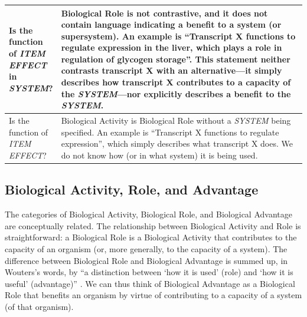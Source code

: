 \documentclass{article}
\begin{document}
\begin{landscape}
\begin{table}
\begin{tabular}{|p{0.17\linewidth}|p{0.97\linewidth}|}
    \hline
    Is the function of \emph{ITEM} \emph{EFFECT} in \emph{SYSTEM}? &  Biological Role is not contrastive, and it does not contain language indicating a benefit to a system (or supersystem). An example is ``Transcript X functions to regulate expression in the liver, which plays a role in regulation of glycogen storage''. This statement neither contrasts transcript X with an alternative---it simply describes how transcript X contributes to a capacity of the \emph{SYSTEM}---nor explicitly describes a benefit to the \emph{SYSTEM}.  \\
    \hline
    Is the function of \emph{ITEM} \emph{EFFECT}? &  Biological Activity is Biological Role without a \emph{SYSTEM} being specified. An example is ``Transcript X functions to regulate expression'', which simply describes what transcript X does. We do not know how (or in what system) it is being used. \\
    \hline
  \end{tabular}
  \label{tab:flowchart}
\end{table}
\end{landscape}

\subsection{Biological Activity, Role, and Advantage}
\label{sec:relat-betw-funct}

The categories of Biological Activity, Biological Role, and Biological Advantage are conceptually related.
The relationship between Biological Activity and Role is straightforward: a Biological Role is a Biological Activity that contributes to the capacity of an organism (or, more generally, to the capacity of a system). 
The difference between Biological Role and Biological Advantage is summed up, in Wouters's words, by ``a distinction between `how it is used' (role) and `how it is useful' (advantage)'' \cite{wouters2003}.
We can thus think of Biological Advantage as a Biological Role that benefits an organism by virtue of contributing to a capacity of a system (of that organism).
\end{document}

